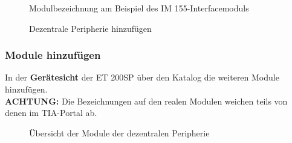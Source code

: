 \begin{figure}[H]
    \centering
   \begin{minipage}[b]{.4\linewidth}
        \centering
        \caption[Modulbezeichnung am Beispiel des IM 155-Interfacemoduls]{Modulbezeichnung am Beispiel des IM 155-Interfacemoduls}
        \label{fig:Bild4.1}
   \end{minipage}
   \hspace{.1\linewidth}%
   \begin{minipage}[b]{.4\linewidth}
        \centering
        \caption[Dezentrale Peripherie hinzufügen]{Dezentrale Peripherie hinzufügen\\}
        \label{fig:Bild4.2}
   \end{minipage}
\end{figure}

\clearpage

\subsubsection{Module hinzufügen}
In der \textbf{Gerätesicht} der ET 200SP über den Katalog die weiteren Module hinzufügen.\\
\textbf{ACHTUNG:} Die Bezeichnungen auf den realen Modulen weichen teils von denen im TIA-Portal ab.

\begin{figure}[H]
   \centering
   \caption[Übersicht der Module der dezentralen Peripherie]{Übersicht der Module der dezentralen Peripherie}
   \label{fig:Bild4.3}
\end{figure}

